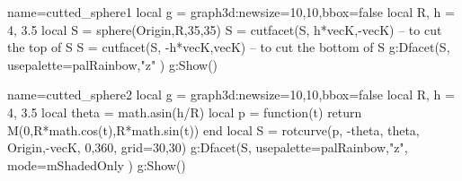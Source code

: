 \documentclass[border=5pt]{standalone}
\begin{document}
\begin{luadraw}{name=cutted_sphere1}
local g = graph3d:new{size={10,10},bbox=false}
local R, h = 4, 3.5
local S = sphere(Origin,R,35,35)
S = cutfacet(S, {h*vecK,-vecK}) -- to cut the top of S
S = cutfacet(S, {-h*vecK,vecK}) -- to cut the bottom of S
g:Dfacet(S, {usepalette={palRainbow,"z"} })
g:Show()
\end{luadraw}

\begin{luadraw}{name=cutted_sphere2}
local g = graph3d:new{size={10,10},bbox=false}
local R, h = 4, 3.5
local theta = math.asin(h/R)
local p = function(t) return M(0,R*math.cos(t),R*math.sin(t)) end
local S = rotcurve(p, -theta, theta, {Origin,-vecK}, 0,360, {grid={30,30}})
g:Dfacet(S, {usepalette={palRainbow,"z"}, mode=mShadedOnly })
g:Show()
\end{luadraw} 
\end{document}
